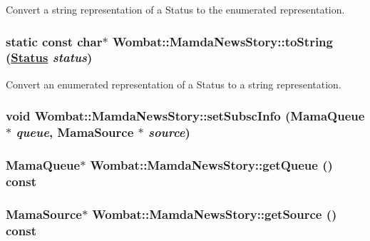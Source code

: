 Convert a string representation of a Status to the enumerated representation. 

\hypertarget{classWombat_1_1MamdaNewsStory_8067357e141e25f851e7a383ae5da62e}{
\subsubsection[toString]{\setlength{\rightskip}{0pt plus 5cm}static const char$\ast$ Wombat::Mamda\-News\-Story::to\-String (\hyperlink{classWombat_1_1MamdaNewsStory_25ee81ce6b01be03a95ab954acdb1e6d}{Status} {\em status})}}
\label{classWombat_1_1MamdaNewsStory_8067357e141e25f851e7a383ae5da62e}


Convert an enumerated representation of a Status to a string representation. 

\hypertarget{classWombat_1_1MamdaNewsStory_4e9e643b30eb88c77f2e8c2a38c189be}{
\subsubsection[setSubscInfo]{\setlength{\rightskip}{0pt plus 5cm}void Wombat::Mamda\-News\-Story::set\-Subsc\-Info (Mama\-Queue $\ast$ {\em queue}, Mama\-Source $\ast$ {\em source})}}
\label{classWombat_1_1MamdaNewsStory_4e9e643b30eb88c77f2e8c2a38c189be}


\hypertarget{classWombat_1_1MamdaNewsStory_20c50ea2ba2a142f047da1971bbc3e25}{
\subsubsection[getQueue]{\setlength{\rightskip}{0pt plus 5cm}Mama\-Queue$\ast$ Wombat::Mamda\-News\-Story::get\-Queue () const}}
\label{classWombat_1_1MamdaNewsStory_20c50ea2ba2a142f047da1971bbc3e25}


\hypertarget{classWombat_1_1MamdaNewsStory_3078ae43414bf47490f7e0a15c489d2b}{
\subsubsection[getSource]{\setlength{\rightskip}{0pt plus 5cm}Mama\-Source$\ast$ Wombat::Mamda\-News\-Story::get\-Source () const}}
\label{classWombat_1_1MamdaNewsStory_3078ae43414bf47490f7e0a15c489d2b}


